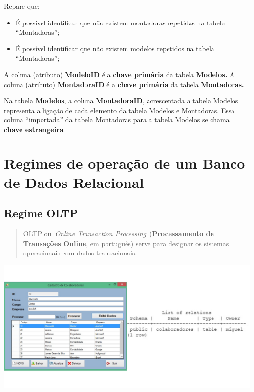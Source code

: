 \documentclass[
]{book}
\begin{document}
Repare que:

\begin{itemize}
\item
  É possível identificar que não existem montadoras repetidas na tabela ``Montadoras'';
\item
  É possível identificar que não existem modelos repetidos na tabela ``Montadoras'';
\end{itemize}

A coluna (atributo) \textbf{ModeloID} é a \textbf{chave primária} da tabela \textbf{Modelos.} A coluna (atributo) \textbf{MontadoraID} é a \textbf{chave primária} da tabela \textbf{Montadoras.}

Na tabela \textbf{Modelos}, a coluna \textbf{MontadoraID}, acrescentada a tabela Modelos representa a ligação de cada elemento da tabela Modelos e Montadoras. Essa coluna ``importada'' da tabela Montadoras para a tabela Modelos se chama \textbf{chave estrangeira}.

\section{Regimes de operação de um Banco de Dados Relacional}\label{regimes-de-operauxe7uxe3o-de-um-banco-de-dados-relacional}

\subsection{Regime OLTP}\label{regime-oltp}

\begin{quote}
OLTP ou~\emph{Online Transaction Processing}~(\textbf{Processamento de Transações Online}, em português) serve para designar os sistemas operacionais com dados transacionais.~
\end{quote}

\includegraphics{images/5-bi/08-crud3.jpg}
\end{document}
